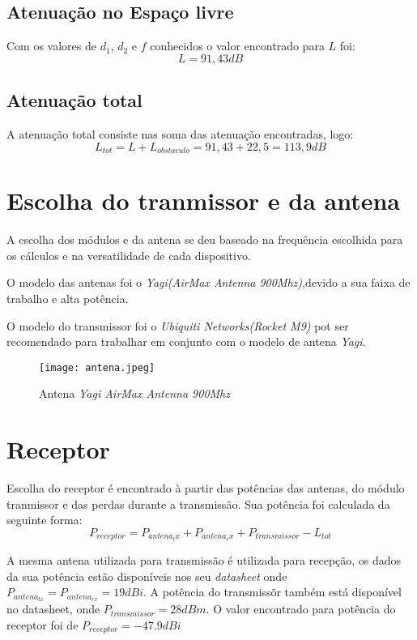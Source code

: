 \subsection{Atenuação no Espaço livre}
Com os valores de $d_1$, $d_2$ e $f$ conhecidos o valor encontrado para $L$ foi:
\begin{equation}
L = 91,43dB
\end{equation}

\subsection{Atenuação total}
A atenuação total consiste nas soma das atenuação encontradas, logo:
\begin{equation}
L_{tot} = L + L_{obstaculo} = 91,43 + 22,5 = 113,9dB 
\end{equation} 

\section{Escolha do tranmissor e da antena}
 A escolha dos módulos e da antena se deu baseado na frequência escolhida para os cálculos e na versatilidade de cada dispositivo. 
 
 O modelo das antenas foi o \textit{Yagi(AirMax Antenna 900Mhz)},devido a sua faixa de trabalho e alta potência.
 
 O modelo do transmissor foi o \textit{Ubiquiti Networks(Rocket M9)} pot ser recomendado para trabalhar em conjunto com o modelo de antena \textit{Yagi}.
 \begin{figure}[h]
 	\centering
 	\texttt{[image: antena.jpeg]}
 	\label{fig:antena}
 	\caption{Antena \textit{Yagi AirMax Antenna 900Mhz} }
 \end{figure} 

\section{Receptor}
Escolha do receptor é encontrado à partir das potências das antenas, do módulo tranmissor e das perdas durante a transmissão. Sua potência foi calculada da seguinte forma:
\begin{equation}
	P_{receptor} = P_{antena_tx} + P_{antena_rx} + P_{transmissor} - L_{tot}
\end{equation}

A mesma antena utilizada para transmissão é utilizada para recepção, os dados da sua potência estão disponíveis nos seu \textit{datasheet} onde $P_{antena_{tx}} = P_{antena_{rx}} = 19dBi$. A potência do transmissõr também está disponível no datasheet, onde $P_{transmissor} = 28dBm$. O valor encontrado para potência do receptor foi de $	P_{receptor} = -47.9dBi$

